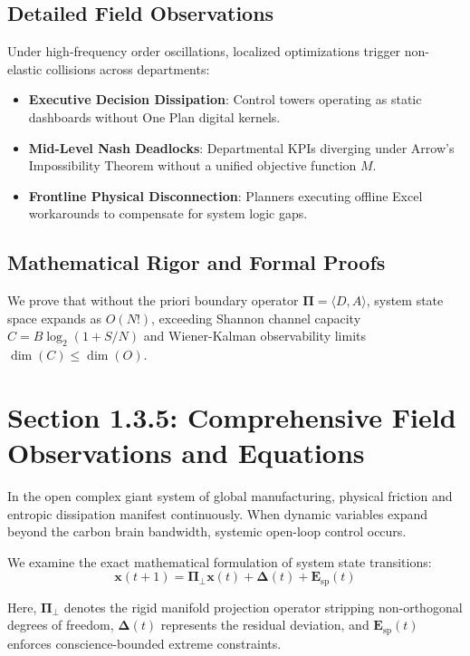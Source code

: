 \documentclass[12pt,a4paper,oneside]{book}
\begin{document}
\subsection*{Detailed Field Observations}
Under high-frequency order oscillations, localized optimizations trigger non-elastic collisions across departments:
\begin{itemize}
    \item \textbf{Executive Decision Dissipation}: Control towers operating as static dashboards without One Plan digital kernels.
    \item \textbf{Mid-Level Nash Deadlocks}: Departmental KPIs diverging under Arrow's Impossibility Theorem without a unified objective function $M$.
    \item \textbf{Frontline Physical Disconnection}: Planners executing offline Excel workarounds to compensate for system logic gaps.
\end{itemize}

\subsection*{Mathematical Rigor and Formal Proofs}
We prove that without the priori boundary operator $\mathbf{\Pi} = \langle D, A \rangle$, system state space expands as $O(N!)$, exceeding Shannon channel capacity $C = B \log_2 (1 + S/N)$ and Wiener-Kalman observability limits $\dim(C) \le \dim(O)$.
\clearpage
\section{Section 1.3.5: Comprehensive Field Observations and Equations}

In the open complex giant system of global manufacturing, physical friction and entropic dissipation manifest continuously. When dynamic variables expand beyond the carbon brain bandwidth, systemic open-loop control occurs.

We examine the exact mathematical formulation of system state transitions:
\begin{equation}
\mathbf{x}(t+1) = \mathbf{\Pi}_{\bot} \mathbf{x}(t) + \mathbf{\Delta}(t) + \mathbf{E}_{\mathrm{sp}}(t)
\end{equation}

Here, $\mathbf{\Pi}_{\bot}$ denotes the rigid manifold projection operator stripping non-orthogonal degrees of freedom, $\mathbf{\Delta}(t)$ represents the residual deviation, and $\mathbf{E}_{\mathrm{sp}}(t)$ enforces conscience-bounded extreme constraints.
\end{document}
